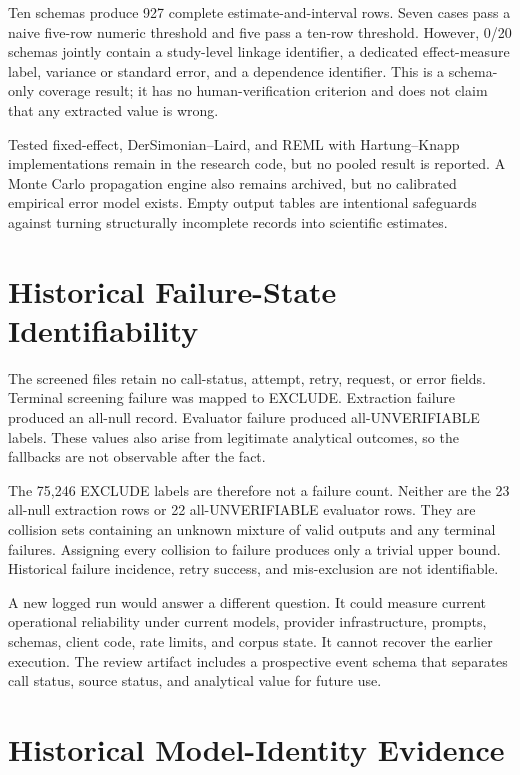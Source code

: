 \documentclass[acmsmall,anonymous,review]{acmart}
\begin{document}
Ten schemas produce 927 complete estimate-and-interval rows. Seven cases pass a naive five-row numeric threshold and five pass a ten-row threshold. However, 0/20 schemas jointly contain a study-level linkage identifier, a dedicated effect-measure label, variance or standard error, and a dependence identifier. This is a schema-only coverage result; it has no human-verification criterion and does not claim that any extracted value is wrong.

Tested fixed-effect, DerSimonian--Laird, and REML with Hartung--Knapp implementations remain in the research code, but no pooled result is reported. A Monte Carlo propagation engine also remains archived, but no calibrated empirical error model exists. Empty output tables are intentional safeguards against turning structurally incomplete records into scientific estimates.

\FloatBarrier
\section{Historical Failure-State Identifiability}

The screened files retain no call-status, attempt, retry, request, or error fields. Terminal screening failure was mapped to EXCLUDE. Extraction failure produced an all-null record. Evaluator failure produced all-UNVERIFIABLE labels. These values also arise from legitimate analytical outcomes, so the fallbacks are not observable after the fact.

The 75,246 EXCLUDE labels are therefore not a failure count. Neither are the 23 all-null extraction rows or 22 all-UNVERIFIABLE evaluator rows. They are collision sets containing an unknown mixture of valid outputs and any terminal failures. Assigning every collision to failure produces only a trivial upper bound. Historical failure incidence, retry success, and mis-exclusion are not identifiable.

A new logged run would answer a different question. It could measure current operational reliability under current models, provider infrastructure, prompts, schemas, client code, rate limits, and corpus state. It cannot recover the earlier execution. The review artifact includes a prospective event schema that separates call status, source status, and analytical value for future use.

\section{Historical Model-Identity Evidence}
\end{document}
